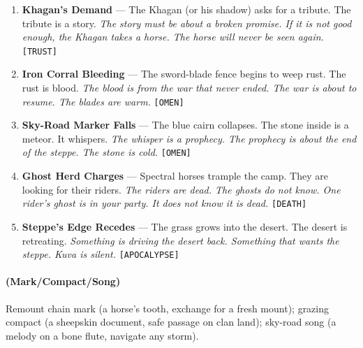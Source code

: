 \begin{enumerate}
\item \textbf{Khagan's Demand} --- The Khagan (or his shadow) asks for a tribute. The tribute is a story.
  \hfill \textit{The story must be about a broken promise. If it is not good enough, the Khagan takes a horse. The horse will never be seen again.} \texttt{[TRUST]}
\item[J] \textbf{Iron Corral Bleeding} --- The sword-blade fence begins to weep rust. The rust is blood.
  \hfill \textit{The blood is from the war that never ended. The war is about to resume. The blades are warm.} \texttt{[OMEN]}
\item[Q] \textbf{Sky-Road Marker Falls} --- The blue cairn collapses. The stone inside is a meteor. It whispers.
  \hfill \textit{The whisper is a prophecy. The prophecy is about the end of the steppe. The stone is cold.} \texttt{[OMEN]}
\item[K] \textbf{Ghost Herd Charges} --- Spectral horses trample the camp. They are looking for their riders.
  \hfill \textit{The riders are dead. The ghosts do not know. One rider's ghost is in your party. It does not know it is dead.} \texttt{[DEATH]}
\item[A] \textbf{Steppe's Edge Recedes} --- The grass grows into the desert. The desert is retreating.
  \hfill \textit{Something is driving the desert back. Something that wants the steppe. Kuva is silent.} \texttt{[APOCALYPSE]}
\end{enumerate}

\paragraph*{(Mark/Compact/Song)} Remount chain mark (a horse's tooth, exchange for a fresh mount); grazing compact (a sheepskin document, safe passage on clan land); sky-road song (a melody on a bone flute, navigate any storm).

